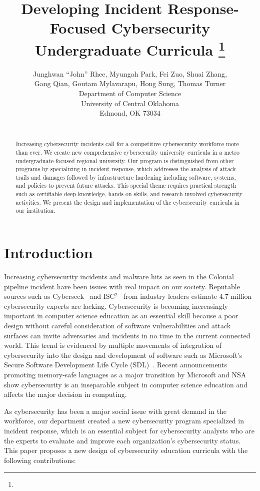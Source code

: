 \documentclass{article}
\title{Developing Incident Response-Focused Cybersecurity Undergraduate Curricula 
\footnote{\protect
}
}
\author{
Junghwan ``John'' Rhee, Myungah Park, Fei Zuo, Shuai Zhang, \\
Gang Qian, Goutam Mylavarapu, Hong Sung, Thomas Turner\\
Department of Computer Science\\
University of Central Oklahoma\\
Edmond, OK 73034\\
\email{\{jrhee2,mpark5,fzuo,szhang10,gqian,smylavarapu,hsung,trturner\}@uco.edu}\\
}
\begin{document}
\maketitle

\begin{abstract}
Increasing cybersecurity incidents call for a competitive cybersecurity workforce more than ever. We create new comprehensive cybersecurity university curricula in a metro undergraduate-focused regional university. Our program is distinguished from other programs by specializing in incident response, which addresses the analysis of attack trails and damages followed by infrastructure hardening including software, systems, and policies to prevent future attacks. This special theme requires practical strength such as certifiable deep knowledge, hands-on skills, and research-involved cybersecurity activities. We present the design and implementation of the cybersecurity curricula in our institution.
\end{abstract}

\section{Introduction}

Increasing cybersecurity incidents and malware hits as seen in the Colonial pipeline incident \cite{colonial} have been issues with real impact on our society. Reputable sources such as Cyberseek~\cite{cyberseek} and ISC$^2$~\cite{isc} from industry leaders estimate 4.7 million cybersecurity experts are lacking. Cybersecurity is becoming increasingly important in computer science education as an essential skill because a poor design without careful consideration of software vulnerabilities and attack surfaces can invite adversaries and incidents in no time in the current connected world. This trend is evidenced by multiple movements of integration of cybersecurity into the design and development of software such as Microsoft's Secure Software Development Life Cycle (SDL)~\cite{sdl}. Recent announcements promoting memory-safe languages as a major transition by Microsoft and NSA show cybersecurity is an inseparable subject in computer science education and affects the major decision in computing.

As cybersecurity has been a major social issue with great demand in the workforce, our department created a new cybersecurity program specialized in incident response, which is an essential subject for cybersecurity analysts who are the experts to evaluate and improve each organization's cybersecurity status.
%
This paper proposes a new design of cybersecurity education curricula with the following contributions:
\end{document}
